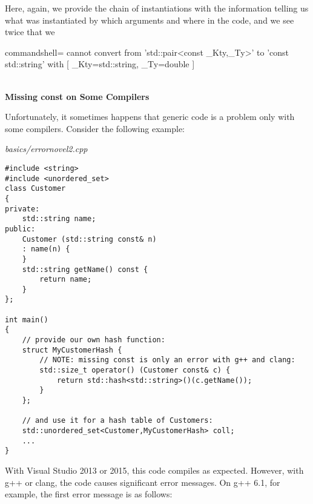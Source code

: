 Here, again, we provide the chain of instantiations with the information telling us what was instantiated by which arguments and where in the code, and we see twice that we

\begin{tcblisting}{commandshell={}}
cannot convert from ’std::pair<const _Kty,_Ty>’ to ’const std::string’
with
[
    _Kty=std::string,
    _Ty=double
]
\end{tcblisting}

\hspace*{\fill} \\ %
\noindent
\textbf{Missing const on Some Compilers}

Unfortunately, it sometimes happens that generic code is a problem only with some compilers. Consider the following example:

\noindent
\textit{basics/errornovel2.cpp}
\begin{lstlisting}[style=styleCXX]
#include <string>
#include <unordered_set>
class Customer
{
private:
	std::string name;
public:
	Customer (std::string const& n)
	: name(n) {
	}
	std::string getName() const {
		return name;
	}
};

int main()
{
	// provide our own hash function:
	struct MyCustomerHash {
		// NOTE: missing const is only an error with g++ and clang:
		std::size_t operator() (Customer const& c) {
			return std::hash<std::string>()(c.getName());
		}
	};

	// and use it for a hash table of Customers:
	std::unordered_set<Customer,MyCustomerHash> coll;
	...
}
\end{lstlisting}

With Visual Studio 2013 or 2015, this code compiles as expected. However, with g++ or clang, the code causes significant error messages. On g++ 6.1, for example, the first error message is as follows:

